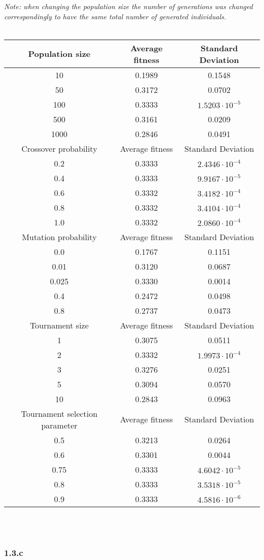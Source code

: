 \documentclass{article}
\begin{document}
\emph{Note: when changing the population size the number of generations was changed correspondingly to have the same total number of generated individuals.}\\\\
\begin{tabular}{c | c | c}
  Population size & Average fitness & Standard Deviation\\
  \hline
  10 & 0.1989 & 0.1548\\
  50 & 0.3172 & 0.0702\\
  100 & 0.3333 & $1.5203\cdot10^{-5}$\\
  500 & 0.3161 & 0.0209\\
  1000 & 0.2846 & 0.0491\\
  \hline
  Crossover probability & Average fitness & Standard Deviation\\
  \hline
  0.2 & 0.3333 & $2.4346\cdot10^{-4}$\\
  0.4 & 0.3333 & $9.9167\cdot10^{-5}$\\
  0.6 & 0.3332 & $3.4182\cdot10^{-4}$\\
  0.8 & 0.3332 & $3.4104\cdot10^{-4}$\\
  1.0 & 0.3332 & $2.0860\cdot10^{-4}$\\
  \hline
  Mutation probability & Average fitness & Standard Deviation\\
  \hline
  0.0 & 0.1767 & 0.1151\\
  0.01 & 0.3120 & 0.0687\\
  0.025 & 0.3330 & 0.0014\\
  0.4 & 0.2472 & 0.0498\\
  0.8 & 0.2737 & 0.0473\\
  \hline
  Tournament size & Average fitness & Standard Deviation\\
  \hline
  1 & 0.3075 & 0.0511\\
  2 & 0.3332 & $1.9973\cdot10^{-4}$\\
  3 & 0.3276 & 0.0251\\
  5 & 0.3094 & 0.0570\\
  10 & 0.2843 & 0.0963\\
  \hline
  Tournament selection parameter & Average fitness & Standard Deviation\\
  \hline
  0.5 & 0.3213 & 0.0264\\
  0.6 & 0.3301 & 0.0044\\
  0.75 & 0.3333 & $4.6042\cdot10^{-5}$\\
  0.8 & 0.3333 & $3.5318\cdot10^{-5}$\\
  0.9 & 0.3333 & $4.5816\cdot10^{-6}$\\
\end{tabular}\\\\

\subsubsection*{1.3.c}
\end{document}
